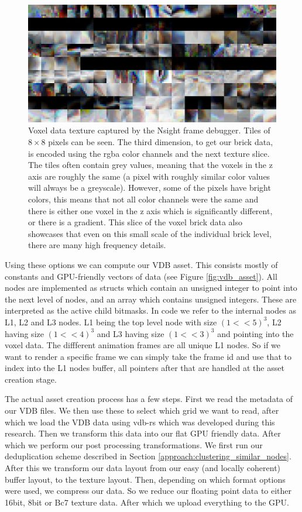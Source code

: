 \begin{figure}
    \centering
    \includegraphics[width=\linewidth]{figures/voxel_memory_view.png}
    \caption{Voxel data texture captured by the Nsight frame debugger. Tiles of $8\times 8$ pixels can be seen. The third dimension, to get our brick data, is encoded using the rgba color channels and the next texture slice. The tiles often contain grey values, meaning that the voxels in the z axis are roughly the same (a pixel with roughly similar color values will always be a greyscale). However, some of the pixels have bright colors, this means that not all color channels were the same and there is either one voxel in the z axis which is significantly different, or there is a gradient. This slice of the voxel brick data also showcases that even on this small scale of the individual brick level, there are many high frequency details.}
    \label{fig:vdb_asset:memory_view}
\end{figure}


Using these options we can compute our VDB asset. This consists mostly of constants and GPU-friendly vectors of data (see Figure \ref{fig:vdb_asset}). All nodes are implemented as structs which contain an unsigned integer to point into the next level of nodes, and an array which contains unsigned integers. These are interpreted as the active child bitmasks. In code we refer to the internal nodes as L1, L2 and L3 nodes. L1 being the top level node with size $(1 << 5)^3$, L2 having size $(1 << 4)^3$ and L3 having size $(1 << 3)^3$ and pointing into the voxel data. The diffferent animation frames are all unique L1 nodes. So if we want to render a specific frame we can simply take the frame id and use that to index into the L1 nodes buffer, all pointers after that are handled at the asset creation stage.

The actual asset creation process has a few steps. First we read the metadata of our VDB files. We then use these to select which grid we want to read, after which we load the VDB data using vdb-rs \cite{VDBRS} which was developed during this research. Then we transform this data into our flat GPU friendly data. After which we perform our post processing transformations. We first run our deduplication scheme described in Section \ref{approach:clustering_similar_nodes}. After this we transform our data layout from our easy (and locally coherent) buffer layout, to the texture layout. Then, depending on which format options were used, we compress our data. So we reduce our floating point data to either 16bit, 8bit or Bc7 texture data. After which we upload everything to the GPU.




